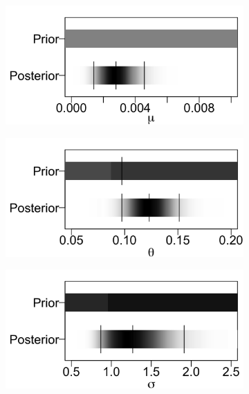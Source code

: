 \documentclass{uwstat572}
\begin{document}
\begin{figure}[t!]
	\centering
	\begin{subfigure}[b]{0.3\textwidth}
		\includegraphics[width=\textwidth]{figures/figure_2a.png}
		\caption{}
		\label{fig:mu_density}
	\end{subfigure}
	\hfill
	\begin{subfigure}[b]{0.3\textwidth}
		\includegraphics[width=\textwidth]{figures/figure_2b.png}
		\caption{}
		\label{fig:theta_density}
	\end{subfigure}
	\hfill
	\begin{subfigure}[b]{0.3\textwidth}
		\includegraphics[width=\textwidth]{figures/figure_2c.png}

\end{subfigure}
\end{figure}
\end{document}
